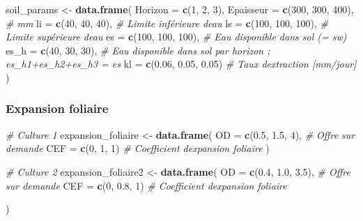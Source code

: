 \documentclass[
]{article}
\newenvironment{Shaded}{\begin{snugshade}}{\end{snugshade}}
\newcommand{\AttributeTok}[1]{\textcolor[rgb]{0.13,0.29,0.53}{#1}}
\newcommand{\CommentTok}[1]{\textcolor[rgb]{0.56,0.35,0.01}{\textit{#1}}}
\newcommand{\DecValTok}[1]{\textcolor[rgb]{0.00,0.00,0.81}{#1}}
\newcommand{\FloatTok}[1]{\textcolor[rgb]{0.00,0.00,0.81}{#1}}
\newcommand{\FunctionTok}[1]{\textcolor[rgb]{0.13,0.29,0.53}{\textbf{#1}}}
\newcommand{\NormalTok}[1]{#1}
\newcommand{\OtherTok}[1]{\textcolor[rgb]{0.56,0.35,0.01}{#1}}
\begin{document}
\begin{Shaded}
\begin{Highlighting}[]
\NormalTok{soil\_params }\OtherTok{\textless{}{-}} \FunctionTok{data.frame}\NormalTok{(}
  \AttributeTok{Horizon     =} \FunctionTok{c}\NormalTok{(}\DecValTok{1}\NormalTok{, }\DecValTok{2}\NormalTok{, }\DecValTok{3}\NormalTok{),}
  \AttributeTok{Epaisseur   =} \FunctionTok{c}\NormalTok{(}\DecValTok{300}\NormalTok{, }\DecValTok{300}\NormalTok{, }\DecValTok{400}\NormalTok{),   }\CommentTok{\# mm}
  \AttributeTok{li          =} \FunctionTok{c}\NormalTok{(}\DecValTok{40}\NormalTok{,  }\DecValTok{40}\NormalTok{,  }\DecValTok{40}\NormalTok{),    }\CommentTok{\# Limite inférieure d\textquotesingle{}eau}
  \AttributeTok{ls          =} \FunctionTok{c}\NormalTok{(}\DecValTok{100}\NormalTok{, }\DecValTok{100}\NormalTok{, }\DecValTok{100}\NormalTok{),   }\CommentTok{\# Limite supérieure d\textquotesingle{}eau}
  \AttributeTok{es          =} \FunctionTok{c}\NormalTok{(}\DecValTok{100}\NormalTok{, }\DecValTok{100}\NormalTok{, }\DecValTok{100}\NormalTok{),   }\CommentTok{\# Eau disponible dans sol (= sw)}
  \AttributeTok{es\_h        =} \FunctionTok{c}\NormalTok{(}\DecValTok{40}\NormalTok{, }\DecValTok{30}\NormalTok{, }\DecValTok{30}\NormalTok{),      }\CommentTok{\# Eau disponible dans sol par horizon ; es\_h1+es\_h2+es\_h3 = es}
  \AttributeTok{kl          =} \FunctionTok{c}\NormalTok{(}\FloatTok{0.06}\NormalTok{, }\FloatTok{0.05}\NormalTok{, }\FloatTok{0.05}\NormalTok{) }\CommentTok{\# Taux d\textquotesingle{}extraction [mm/jour]}
\NormalTok{)}
\end{Highlighting}
\end{Shaded}

\subsubsection{Expansion foliaire}\label{expansion-foliaire}

\begin{Shaded}
\begin{Highlighting}[]
\CommentTok{\# Culture 1}
\NormalTok{expansion\_foliaire }\OtherTok{\textless{}{-}} \FunctionTok{data.frame}\NormalTok{(}
  \AttributeTok{OD  =} \FunctionTok{c}\NormalTok{(}\FloatTok{0.5}\NormalTok{, }\FloatTok{1.5}\NormalTok{, }\DecValTok{4}\NormalTok{), }\CommentTok{\# Offre sur demande}
  \AttributeTok{CEF =} \FunctionTok{c}\NormalTok{(}\DecValTok{0}\NormalTok{,   }\DecValTok{1}\NormalTok{,   }\DecValTok{1}\NormalTok{)  }\CommentTok{\# Coefficient d\textquotesingle{}expansion foliaire}
\NormalTok{)}

\CommentTok{\# Culture 2}
\NormalTok{expansion\_foliaire2 }\OtherTok{\textless{}{-}} \FunctionTok{data.frame}\NormalTok{(}
  \AttributeTok{OD  =} \FunctionTok{c}\NormalTok{(}\FloatTok{0.4}\NormalTok{, }\FloatTok{1.0}\NormalTok{, }\FloatTok{3.5}\NormalTok{), }\CommentTok{\# Offre sur demande}
  \AttributeTok{CEF =} \FunctionTok{c}\NormalTok{(}\DecValTok{0}\NormalTok{,   }\FloatTok{0.8}\NormalTok{, }\DecValTok{1}\NormalTok{)    }\CommentTok{\# Coefficient d\textquotesingle{}expansion foliaire}

\NormalTok{)}
\end{Highlighting}
\end{Shaded}
\end{document}
